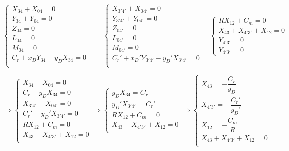 \documentclass[11pt,oneside]{article}
\begin{document}
$$
\left\{
\begin{array}{l}
{X_{34}}+{X_{04}}=0 \\
{Y_{34}}+{Y_{04}}=0 \\
{Z_{04}}=0 \\
{L_{04}}=0\\
{M_{04}}=0\\
{C_r}+{x_DY_{34}-y_DX_{34}}=0 \\
\end{array}
\right.
\quad \quad
\left\{
\begin{array}{l}
{X_{3'4'}}+{X_{04'}}=0 \\
{Y_{3'4'}}+{Y_{04'}}=0 \\
{Z_{04'}}=0 \\
{L_{04'}}=0\\
{M_{04'}}=0\\
{C_r'}+{x_D'Y_{3'4'}-y_D'X_{3'4'}}=0 \\
\end{array}
\right.
\quad 
\left\{
\begin{array}{l}
R X_{12} + C_m = 0\\
X_{43}+X_{4'3'}+X_{12}=0\\
Y_{4'3'}=0\\
Y_{4'3'}=0
\end{array}
\right.
$$


$$
\Longrightarrow
\left\{
\begin{array}{l}
{X_{34}}+{X_{04}}=0 \\
{C_r}-y_DX_{34}=0 \\
{X_{3'4'}}+{X_{04'}}=0 \\
{C_r'}-y_D'X_{3'4'}=0 \\
R X_{12} + C_m = 0\\
X_{43}+X_{4'3'}+X_{12}=0\\
\end{array}
\right.
\Longrightarrow
\left\{
\begin{array}{l}
y_DX_{34}={C_r} \\
y_D'X_{3'4'}={C_r'} \\
R X_{12} + C_m = 0\\
X_{43}+X_{4'3'}+X_{12}=0\\
\end{array}
\right.
\Longrightarrow
\left\{
\begin{array}{l}
X_{43}=-\dfrac{C_r}{y_D} \\
X_{4'3'}=-\dfrac{C_r'}{y_D'} \\
X_{12} = -\dfrac{C_m}{R}\\
X_{43}+X_{4'3'}+X_{12}=0\\
\end{array}
\right.
$$
\end{document}
